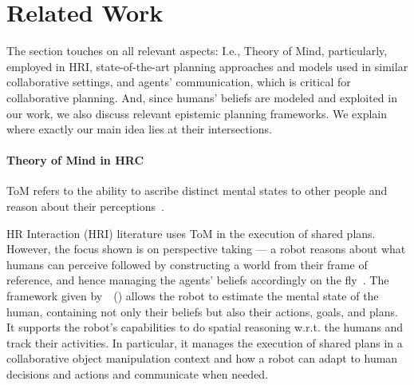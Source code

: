 \documentclass[letterpaper]{article} %
\begin{document}

\section{Related Work} \label{sec:related-work}
The section touches on all relevant aspects: I.e., Theory of Mind, particularly, employed in HRI, state-of-the-art planning approaches and models used in similar collaborative settings, and agents' communication, which is critical for collaborative planning. And, since humans' beliefs are modeled and exploited in our work, we also discuss relevant epistemic planning frameworks. We explain where exactly our main idea lies at their intersections.   

\paragraph{Theory of Mind in HRC}
ToM refers to the ability to ascribe distinct mental states to other people and reason about their perceptions~\cite{baron1985does}. 

HR Interaction (HRI) literature uses ToM in the execution of shared plans. However, the focus shown is on perspective taking --- a robot reasons about what humans can perceive followed by constructing a world from their frame of reference, and hence managing the agents' beliefs accordingly on the fly~\cite{berlin2006perspective,milliez2014framework}.
The framework given by~\citeauthor{devin2016implemented}~(\citeyear{devin2016implemented}) allows the robot to estimate the mental state of the human, containing not only their beliefs but also their actions, goals, and plans. 
It supports the robot's capabilities to do spatial reasoning w.r.t. the humans and track their activities. 
In particular, it manages the execution of shared plans in a collaborative object manipulation context and how a robot can adapt to human decisions and actions and communicate when needed.
\end{document}
